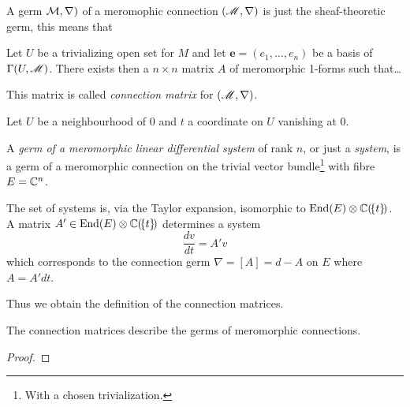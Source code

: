A germ $\mathcal{M},\nabla)$ of a meromophic connection $(\mathscr{M},\nabla)$ is just the
sheaf-theoretic germ, this means that \TODO

\begin{paracol}{2}\sloppy
\switchcolumn[0]\noindent
  Let $U$ be a trivializing open set for $M$ and let
  $\textbf{e}=(e_1,\dots,e_n)$ be a basis of $\Gamma(U,\mathscr{M})$.
  There exists then a $n\times n$ matrix $A$ of meromorphic 1-forms such
  that\dots
  \begin{defn}
    This matrix is called \emph{connection matrix} for $(\mathscr{M},\nabla)$.
  \end{defn}
\switchcolumn[1]\noindent
  Let $U$ be a neighbourhood of $0$ and $t$ a coordinate on $U$ vanishing at
  $0$.
\end{paracol}

\begin{comment}
  Some Literature like \cite{sabbah_cimpa90} always talks about germs\dots
\end{comment}
\begin{defn}
  A \emph{germ of a meromorphic linear differential system} of rank $n$, or
  just a \emph{system}, is a germ of a meromorphic connection on the trivial
  vector bundle\footnote{With a chosen trivialization.} with fibre $E=\mathbb{C}^n$.
\end{defn}
The set of systems is, via the Taylor expansion, isomorphic to
$\operatorname{End}(E)\otimes\mathbb{C}(\!\{t\}\!)$. A matrix
$A'\in\operatorname{End}(E)\otimes\mathbb{C}(\!\{t\}\!)$ determines a system
\[
  \frac{dv}{dt}=A'v
\]
which corresponds to the connection germ $\nabla=[A]=d-A$ on $E$ where
$A=A'dt$.
\begin{paracol}{2}\sloppy
\switchcolumn[1]\noindent
  Thus we obtain the definition of the connection matrices.
\end{paracol}
\begin{comment}
  \cite{boalch} wants \textbf{generic} meromorphic connections
  \begin{itemize}
    \item\dots simplest jet sufficient\dots
  \end{itemize}
\end{comment}

\begin{cor}
  The connection matrices describe the germs of meromorphic connections.
\end{cor}
\begin{proof}
  \TODO
\end{proof}

